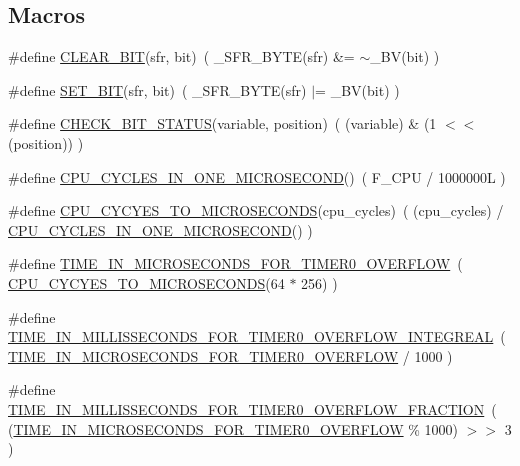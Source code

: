 \subsection*{Macros}
\begin{DoxyCompactItemize}
\item 
\#define \hyperlink{group__custom__timer_gacc909e5f043b5318d641501c53797a90}{C\+L\+E\+A\+R\+\_\+\+B\+IT}(sfr,  bit)~( \+\_\+\+S\+F\+R\+\_\+\+B\+Y\+TE(sfr) \&= $\sim$\+\_\+\+BV(bit) )
\item 
\#define \hyperlink{group__custom__timer_ga1f93c89b65418805c2091b08e58afce6}{S\+E\+T\+\_\+\+B\+IT}(sfr,  bit)~( \+\_\+\+S\+F\+R\+\_\+\+B\+Y\+TE(sfr) $\vert$= \+\_\+\+BV(bit) )
\item 
\#define \hyperlink{group__custom__timer_gabe3ffe6bf57a996216bfa6f354e0c6b4}{C\+H\+E\+C\+K\+\_\+\+B\+I\+T\+\_\+\+S\+T\+A\+T\+US}(variable,  position)~( (variable) \& (1 $<$$<$ (position)) )
\item 
\#define \hyperlink{group__custom__timer_gad0acb4825948dc06e71c3ddca2187b2e}{C\+P\+U\+\_\+\+C\+Y\+C\+L\+E\+S\+\_\+\+I\+N\+\_\+\+O\+N\+E\+\_\+\+M\+I\+C\+R\+O\+S\+E\+C\+O\+ND}()~( F\+\_\+\+C\+PU / 1000000\+L )
\item 
\#define \hyperlink{group__custom__timer_gac232252c50728b49e5f0633a3a4569c3}{C\+P\+U\+\_\+\+C\+Y\+C\+Y\+E\+S\+\_\+\+T\+O\+\_\+\+M\+I\+C\+R\+O\+S\+E\+C\+O\+N\+DS}(cpu\+\_\+cycles)~( (cpu\+\_\+cycles) / \hyperlink{group__custom__timer_gad0acb4825948dc06e71c3ddca2187b2e}{C\+P\+U\+\_\+\+C\+Y\+C\+L\+E\+S\+\_\+\+I\+N\+\_\+\+O\+N\+E\+\_\+\+M\+I\+C\+R\+O\+S\+E\+C\+O\+ND}() )
\item 
\#define \hyperlink{group__custom__timer_ga5887b9c091480c79bc1f19c0c8eb9b40}{T\+I\+M\+E\+\_\+\+I\+N\+\_\+\+M\+I\+C\+R\+O\+S\+E\+C\+O\+N\+D\+S\+\_\+\+F\+O\+R\+\_\+\+T\+I\+M\+E\+R0\+\_\+\+O\+V\+E\+R\+F\+L\+OW}~( \hyperlink{group__custom__timer_gac232252c50728b49e5f0633a3a4569c3}{C\+P\+U\+\_\+\+C\+Y\+C\+Y\+E\+S\+\_\+\+T\+O\+\_\+\+M\+I\+C\+R\+O\+S\+E\+C\+O\+N\+DS}(64 $\ast$ 256) )
\item 
\#define \hyperlink{group__custom__timer_gad18b0b3ac32d120785d5437328854938}{T\+I\+M\+E\+\_\+\+I\+N\+\_\+\+M\+I\+L\+L\+I\+S\+S\+E\+C\+O\+N\+D\+S\+\_\+\+F\+O\+R\+\_\+\+T\+I\+M\+E\+R0\+\_\+\+O\+V\+E\+R\+F\+L\+O\+W\+\_\+\+I\+N\+T\+E\+G\+R\+E\+AL}~( \hyperlink{group__custom__timer_ga5887b9c091480c79bc1f19c0c8eb9b40}{T\+I\+M\+E\+\_\+\+I\+N\+\_\+\+M\+I\+C\+R\+O\+S\+E\+C\+O\+N\+D\+S\+\_\+\+F\+O\+R\+\_\+\+T\+I\+M\+E\+R0\+\_\+\+O\+V\+E\+R\+F\+L\+OW} / 1000 )
\item 
\#define \hyperlink{group__custom__timer_gaf093c9ad815d86b24c0f081dceb84737}{T\+I\+M\+E\+\_\+\+I\+N\+\_\+\+M\+I\+L\+L\+I\+S\+S\+E\+C\+O\+N\+D\+S\+\_\+\+F\+O\+R\+\_\+\+T\+I\+M\+E\+R0\+\_\+\+O\+V\+E\+R\+F\+L\+O\+W\+\_\+\+F\+R\+A\+C\+T\+I\+ON}~( (\hyperlink{group__custom__timer_ga5887b9c091480c79bc1f19c0c8eb9b40}{T\+I\+M\+E\+\_\+\+I\+N\+\_\+\+M\+I\+C\+R\+O\+S\+E\+C\+O\+N\+D\+S\+\_\+\+F\+O\+R\+\_\+\+T\+I\+M\+E\+R0\+\_\+\+O\+V\+E\+R\+F\+L\+OW} \% 1000) $>$$>$ 3 )

\end{DoxyCompactItemize}
